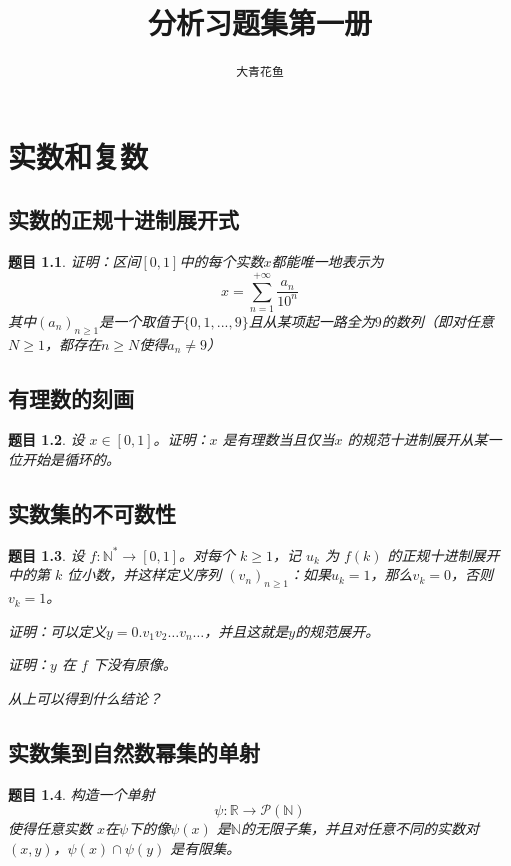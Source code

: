 \documentclass[12pt,UTF8,fontset=none]{ctexbook}
\title{\zihao{0} \bfseries 分析习题集第一册}
\author{\zihao{2} \texttt{大青花鱼}}
\date{}
\theoremstyle{exercisestyle}
\newtheorem*{exercise}{题目}
\theoremstyle{solutionstyle}
\begin{document}
\maketitle
\tableofcontents
\newpage

\chapter{实数和复数}
\section{实数的正规十进制展开式}
\begin{exercise}
证明：区间$[0,1]$中的每个实数$x$都能唯一地表示为
$$x = \sum_{n=1}^{+\infty} \frac{a_n}{10^n}$$
其中$(a_n)_{n \geq 1}$是一个取值于$\{0,1,...,9\}$且从某项起一路全为$9$的数列（即对任意$N \ge 1$，都存在$n \ge N$使得$a_n \ne 9$）
\end{exercise}

\section{有理数的刻画}\label{caractérisation-des-rationnels}
\begin{exercise}
设 $x \in [0,1]$。证明：$x$ 是有理数当且仅当$x$ 的规范十进制展开从某一位开始是循环的。  

\end{exercise}

\section{实数集的不可数性}\label{non-dénombrabilité-de-r}
\begin{exercise}
设 $f: \mathbb{N}^* \to [0,1]$。对每个 $k \geq 1$，记 $u_k$ 为 $f(k)$ 的正规十进制展开中的第 $k$ 位小数，并这样定义序列 $(v_n)_{n\geq 1}$：如果$u_k = 1$，那么$v_k = 0$，否则 $v_k = 1$。
\begin{subquestions}
\item 证明：可以定义$y = 0.v_1 v_2 \ldots v_n \ldots$，并且这就是$y$的规范展开。
\item 证明：$y$ 在 $f$ 下没有原像。
\item 从上可以得到什么结论？
\end{subquestions}
\end{exercise}

\section{实数集到自然数幂集的单射}
\begin{exercise}
构造一个单射
$$
\psi : \mathbb{R} \to \mathcal{P}(\mathbb{N})
$$
使得任意实数 $x$在$\psi$下的像$\psi(x)$ 是$\mathbb{N}$的无限子集，并且对任意不同的实数对 $(x, y)$，$\psi(x) \cap \psi(y)$ 是有限集。

\end{exercise}
\end{document}
